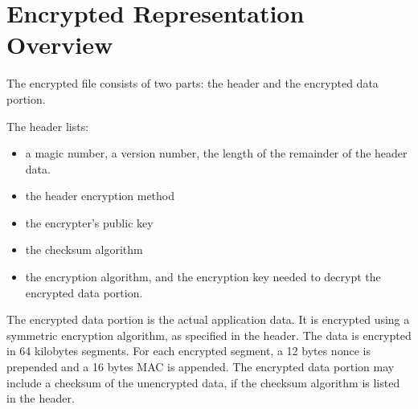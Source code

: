 \section{Encrypted Representation Overview}
The encrypted file consists of two parts: the header and the encrypted data portion.

The header lists:
\begin{itemize}
\item a magic number, a version number, the length of the remainder of the header data.
\item the header encryption method
\item the encrypter's public key
\item the checksum algorithm
\item the encryption algorithm, and the encryption key needed to decrypt the encrypted data portion.
\end{itemize}

The encrypted data portion is the actual application data.
% 
It is encrypted using a symmetric encryption algorithm, as specified in the header.
% 
The data is encrypted in 64 kilobytes segments. For each encrypted segment, a 12 bytes nonce is prepended and a 16 bytes MAC is appended.
% 
The encrypted data portion may include a checksum of the unencrypted data, if the checksum algorithm is listed in the header.

